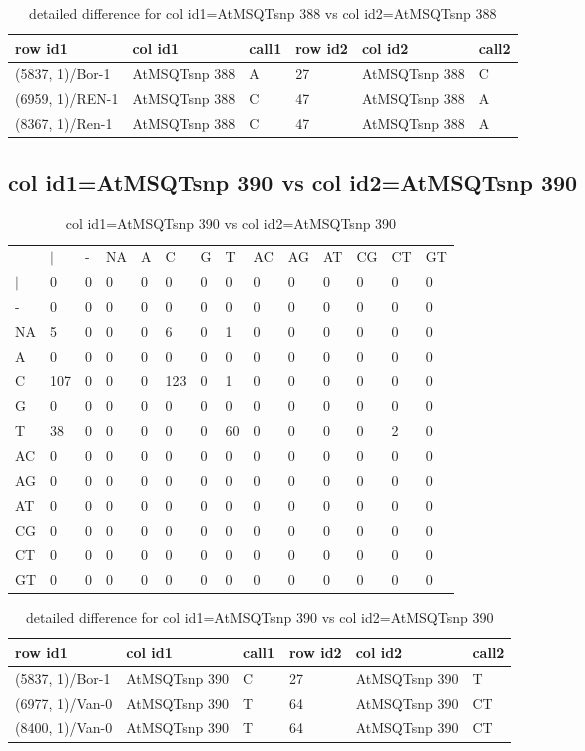 \begin{center}
\begin{longtable}{|l|l|l|l|l|l|}
\caption{detailed difference for col id1=AtMSQTsnp 388 vs col id2=AtMSQTsnp 388} \label{table_dm901}\\
\hline
row id1&col id1&call1&row id2&col id2&call2\\
\hline
(5837, 1)/Bor-1&AtMSQTsnp 388&A&27&AtMSQTsnp 388&C\\
(6959, 1)/REN-1&AtMSQTsnp 388&C&47&AtMSQTsnp 388&A\\
(8367, 1)/Ren-1&AtMSQTsnp 388&C&47&AtMSQTsnp 388&A\\
\hline
\end{longtable}
\end{center}

\subsection{col id1=AtMSQTsnp 390 vs col id2=AtMSQTsnp 390}
\begin{center}
\begin{longtable}{|l|l|l|l|l|l|l|l|l|l|l|l|l|l|}
\caption{col id1=AtMSQTsnp 390 vs col id2=AtMSQTsnp 390} \label{table_dm902}\\
\hline
\\
\hline
&$|$&-&NA&A&C&G&T&AC&AG&AT&CG&CT&GT\\
$|$&0&0&0&0&0&0&0&0&0&0&0&0&0\\
-&0&0&0&0&0&0&0&0&0&0&0&0&0\\
NA&5&0&0&0&6&0&1&0&0&0&0&0&0\\
A&0&0&0&0&0&0&0&0&0&0&0&0&0\\
C&107&0&0&0&123&0&1&0&0&0&0&0&0\\
G&0&0&0&0&0&0&0&0&0&0&0&0&0\\
T&38&0&0&0&0&0&60&0&0&0&0&2&0\\
AC&0&0&0&0&0&0&0&0&0&0&0&0&0\\
AG&0&0&0&0&0&0&0&0&0&0&0&0&0\\
AT&0&0&0&0&0&0&0&0&0&0&0&0&0\\
CG&0&0&0&0&0&0&0&0&0&0&0&0&0\\
CT&0&0&0&0&0&0&0&0&0&0&0&0&0\\
GT&0&0&0&0&0&0&0&0&0&0&0&0&0\\
\hline
\end{longtable}
\end{center}

\begin{center}
\begin{longtable}{|l|l|l|l|l|l|}
\caption{detailed difference for col id1=AtMSQTsnp 390 vs col id2=AtMSQTsnp 390} \label{table_dm903}\\
\hline
row id1&col id1&call1&row id2&col id2&call2\\
\hline
(5837, 1)/Bor-1&AtMSQTsnp 390&C&27&AtMSQTsnp 390&T\\
(6977, 1)/Van-0&AtMSQTsnp 390&T&64&AtMSQTsnp 390&CT\\
(8400, 1)/Van-0&AtMSQTsnp 390&T&64&AtMSQTsnp 390&CT\\
\hline
\end{longtable}
\end{center}

